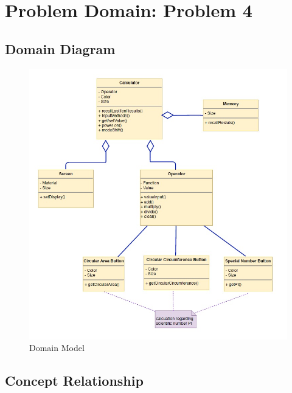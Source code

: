 \chapter{Problem Domain: Problem 4}
\vspace{8pt}

\section{Domain Diagram}

\begin{figure}[H]
\centering  %

\label{Fig.sub.1}
\includegraphics[width=1\textwidth]{images/class_diagram.jpg}
\caption{Domain Model}
\label{Fig.main}
\end{figure}
\vspace{50pt}

\section{Concept Relationship}

